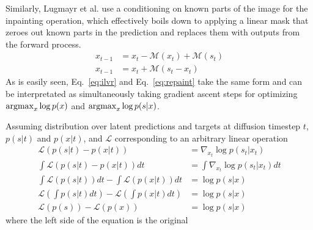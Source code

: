 Similarly, Lugmayr et al. use a conditioning on known parts of the image for the inpainting operation, which effectively boils down to applying a linear mask that zeroes out known parts in the prediction and replaces them with outputs from the forward process.
\begin{align}
    \label{eq:repaint}
    x_{t-1} & = x_t - \mathcal{M}(x_t) + \mathcal{M}(s_t) \\
    x_{t-1} & = x_t + \mathcal{M}(s_t - x_t)
\end{align}
As is easily seen, Eq.~\ref{eq:ilvr} and Eq.~\ref{eq:repaint} take the same form and can be interpretated as simultaneously taking gradient ascent steps for optimizing $\operatorname*{argmax}_x \log p(x)$ and $\operatorname*{argmax}_x \log p(s|x)$.

Assuming distribution over latent predictions and targets at diffusion timestep $t$, $p(s|t)$ and $p(x|t)$, and $\mathcal{L}$ corresponding to an arbitrary linear operation
\begin{align}
    \mathcal{L}(p(s|t) - p(x|t))                                                       & = \nabla_{x_t} \log p(s_t|x_t)         \\
    \int \mathcal{L}(p(s|t) - p(x|t)) dt                                               & = \int \nabla_{x_t} \log p(s_t|x_t) dt \\
    \int \mathcal{L}(p(s|t))dt - \int \mathcal{L}(p(x|t))dt                            & = \log p(s|x)                          \\
    \mathcal{L} \left(\int p(s|t)dt \right) - \mathcal{L} \left( \int p(x|t)dt \right) & = \log p(s|x)                          \\
    \mathcal{L}(p(s)) - \mathcal{L}(p(x))                                              & = \log p(s|x)
\end{align}
where the left side of the equation is the original
